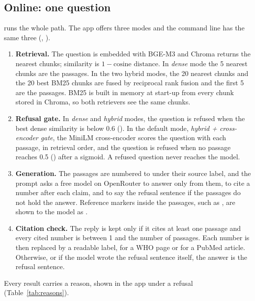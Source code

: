 \subsection{Online: one question}

 runs the whole path. The app offers three modes and the command line
has the same three (, ).

\begin{enumerate}[leftmargin=1.5em]
  \item \textbf{Retrieval.} The question is embedded with BGE-M3 and Chroma returns the nearest
        chunks; similarity is $1 - \text{cosine distance}$. In \emph{dense} mode the 5 nearest
        chunks are the passages. In the two hybrid modes, the 20 nearest chunks and the 20 best
        BM25 chunks are fused by reciprocal rank fusion and the first 5 are the passages. BM25 is
        built in memory at start-up from every chunk stored in Chroma, so both retrievers see the
        same chunks.
  \item \textbf{Refusal gate.} In \emph{dense} and \emph{hybrid} modes, the question is refused when
        the best dense similarity is below 0.6 (). In the default mode,
        \emph{hybrid + cross-encoder gate}, the MiniLM cross-encoder scores the question with each
        passage, in retrieval order, and the question is refused when no passage reaches 0.5
        () after a sigmoid. A refused question never reaches the model.
  \item \textbf{Generation.} The passages are numbered \code{[1]} to \code{[5]} under their source
        label, and the prompt asks a free model on OpenRouter to answer only from them, to cite a
        number after each claim, and to say the refusal sentence if the passages do not hold the
        answer. Reference markers inside the passages, such as \code{[12]}, are shown to the model
        as .
  \item \textbf{Citation check.} The reply is kept only if it cites at least one passage and every
        cited number is between 1 and the number of passages. Each number is then replaced by a
        readable label, \code{[file, p. N]} for a WHO page or  for a PubMed
        article. Otherwise, or if the model wrote the refusal sentence itself, the answer is the
        refusal sentence.
\end{enumerate}

Every result carries a reason, shown in the app under a refusal (Table~\ref{tab:reasons}).

